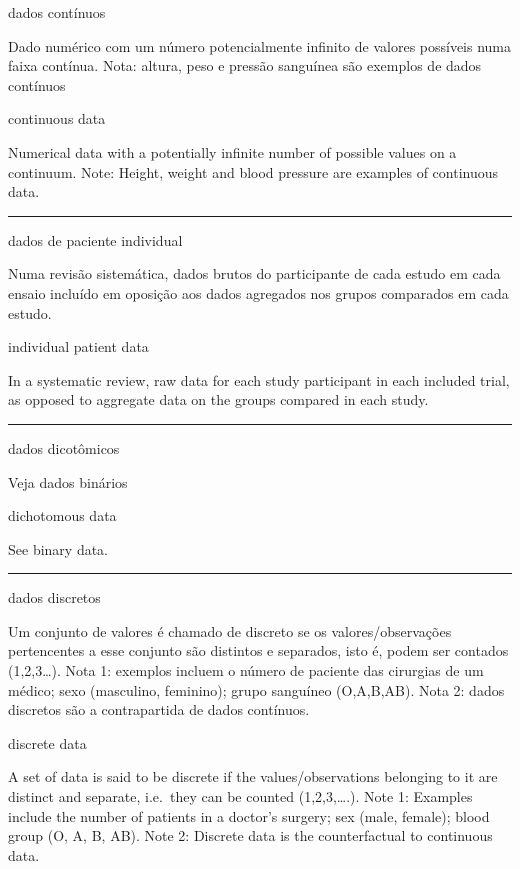 \documentclass[
  openany]{book}
\begin{document}
dados contínuos

Dado numérico com um número potencialmente infinito de valores possíveis numa faixa contínua. Nota: altura, peso e pressão sanguínea são exemplos de dados contínuos

continuous data

Numerical data with a potentially infinite number of possible values on a continuum. Note: Height, weight and blood pressure are examples of continuous data.

\begin{center}\rule{0.5\linewidth}{0.5pt}\end{center}

dados de paciente individual

Numa revisão sistemática, dados brutos do participante de cada estudo em cada ensaio incluído em oposição aos dados agregados nos grupos comparados em cada estudo.

individual patient data

In a systematic review, raw data for each study participant in each included trial, as opposed to aggregate data on the groups compared in each study.

\begin{center}\rule{0.5\linewidth}{0.5pt}\end{center}

dados dicotômicos

Veja dados binários

dichotomous data

See binary data.

\begin{center}\rule{0.5\linewidth}{0.5pt}\end{center}

dados discretos

Um conjunto de valores é chamado de discreto se os valores/observações pertencentes a esse conjunto são distintos e separados, isto é, podem ser contados (1,2,3\ldots). Nota 1: exemplos incluem o número de paciente das cirurgias de um médico; sexo (masculino, feminino); grupo sanguíneo (O,A,B,AB). Nota 2: dados discretos são a contrapartida de dados contínuos.

discrete data

A set of data is said to be discrete if the values/observations belonging to it are distinct and separate, i.e.~they can be counted (1,2,3,\ldots.). Note 1: Examples include the number of patients in a doctor's surgery; sex (male, female); blood group (O, A, B, AB). Note 2: Discrete data is the counterfactual to continuous data.
\end{document}
